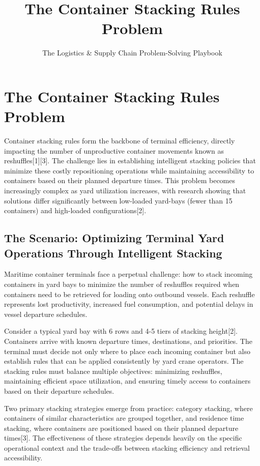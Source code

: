 \documentclass{article}
\title{The Container Stacking Rules Problem}
\author{The Logistics \& Supply Chain Problem-Solving Playbook}
\date{}
\begin{document}
\maketitle

\section{The Container Stacking Rules Problem}

Container stacking rules form the backbone of terminal efficiency, directly impacting the number of unproductive container movements known as reshuffles[1][3]. The challenge lies in establishing intelligent stacking policies that minimize these costly repositioning operations while maintaining accessibility to containers based on their planned departure times. This problem becomes increasingly complex as yard utilization increases, with research showing that solutions differ significantly between low-loaded yard-bays (fewer than 15 containers) and high-loaded configurations[2].

\subsection{The Scenario: Optimizing Terminal Yard Operations Through Intelligent Stacking}

Maritime container terminals face a perpetual challenge: how to stack incoming containers in yard bays to minimize the number of reshuffles required when containers need to be retrieved for loading onto outbound vessels. Each reshuffle represents lost productivity, increased fuel consumption, and potential delays in vessel departure schedules.

Consider a typical yard bay with 6 rows and 4-5 tiers of stacking height[2]. Containers arrive with known departure times, destinations, and priorities. The terminal must decide not only where to place each incoming container but also establish rules that can be applied consistently by yard crane operators. The stacking rules must balance multiple objectives: minimizing reshuffles, maintaining efficient space utilization, and ensuring timely access to containers based on their departure schedules.

Two primary stacking strategies emerge from practice: category stacking, where containers of similar characteristics are grouped together, and residence time stacking, where containers are positioned based on their planned departure times[3]. The effectiveness of these strategies depends heavily on the specific operational context and the trade-offs between stacking efficiency and retrieval accessibility.
\end{document}

